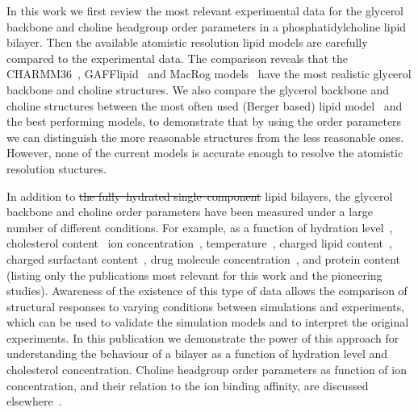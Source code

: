 \documentclass[pre,aps,floatfix,authordate1-4,twocolumn]{revtex4-1}
\providecommand{\DIFadd}[1]{{\protect\color{blue}\uwave{#1}}} %
\providecommand{\DIFdel}[1]{{\protect\color{red}\sout{#1}}}                      %
\providecommand{\DIFaddbegin}{} %
\providecommand{\DIFaddend}{} %
\providecommand{\DIFdelbegin}{} %
\providecommand{\DIFdelend}{} %
\begin{document}
In this work we first review the most relevant experimental data for the glycerol backbone and choline headgroup order parameters
in a phosphatidylcholine lipid bilayer. Then the available atomistic resolution lipid models are carefully compared to the 
experimental data. The comparison reveals that the CHARMM36~\cite{klauda10}, GAFFlipid~\cite{dickson12} and MacRog models~\cite{maciejewski14}
have the most realistic glycerol backbone and choline structures. We also compare the glycerol backbone and choline 
structures between the most often used (Berger based) lipid model~\cite{berger97} 
and the best performing models, to demonstrate that by using the 
order parameters we can distinguish the more reasonable structures from the less reasonable ones. However, none of the current models 
is accurate enough to \DIFaddbegin \DIFadd{properly }\DIFaddend resolve the atomistic resolution stuctures.

In addition to \DIFdelbegin \DIFdel{the fully--hydrated single--component }\DIFdelend \DIFaddbegin \DIFadd{fully hydrated single component }\DIFaddend lipid bilayers, the glycerol backbone and choline order parameters
have been measured under a large number of different conditions. For example, as a function of hydration level~\cite{bechinger91,ulrich94,dvinskikh05b}, cholesterol content~\cite{brown78,ferreira13}
ion concentration~\cite{brown77,akutsu81,altenbach84,roux90,roux91}, temperature~\cite{gally75}, charged lipid content~\cite{roux90,roux91}, charged surfactant content~\cite{scherer89}, 
drug molecule concentration~\cite{browning82,kelusky84,castro08}, and protein content~\cite{roux89,kuchinka89} (listing only the publications most relevant for this work and the pioneering studies).
Awareness of the existence of this type of data allows the comparison of structural responses to varying conditions between simulations and experiments,
which can be used to validate the simulation models and to interpret the original experiments. 
In this publication we demonstrate the power of this approach for understanding the behaviour of a bilayer as a function of hydration level and cholesterol concentration.
Choline headgroup order parameters as function of ion concentration, and their relation to the ion binding affinity, are discussed elsewhere~\cite{ionpaper}.
\end{document}
